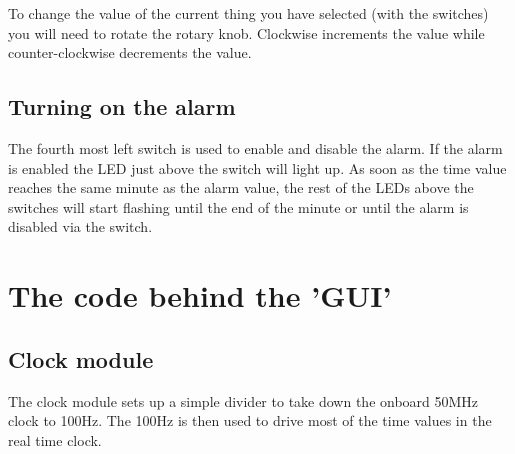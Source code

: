 \documentclass[12pt,a4paper,hidelinks]{article}            %
\begin{document}
To change the value of the current thing you have selected (with the switches) you will need to rotate the rotary knob. Clockwise increments the value while counter-clockwise decrements the value.

\subsection{Turning on the alarm}

\begin{figure}[H]
\centering
{}
\label{fig:setalarm}
\end{figure}

The fourth most left switch is used to enable and disable the alarm. If the alarm is enabled the LED just above the switch will light up. As soon as the time value reaches the same minute as the alarm value, the rest of the LEDs above the switches will start flashing until the end of the minute or until the alarm is disabled via the switch.

\section{The code behind the 'GUI'}

\subsection{Clock module}

The clock module sets up a simple divider to take down the onboard 50MHz clock to 100Hz. The 100Hz is then used to drive most of the time values in the real time clock.
\end{document}
